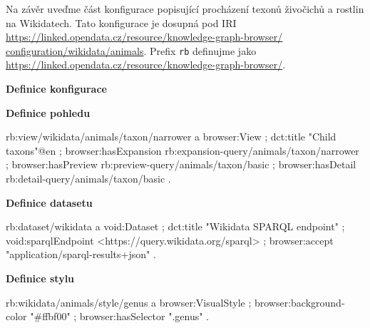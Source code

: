 \begin{prikl}
Na závěr uveďme část konfigurace popisující procházení texonů živočichů a rostlin na Wikidatech. Tato konfigurace je dosupná pod IRI \\\href{https://linked.opendata.cz/resource/knowledge-graph-browser/configuration/wikidata/animals}{https://linked.opendata.cz/resource/knowledge-graph-browser/}\\\href{https://linked.opendata.cz/resource/knowledge-graph-browser/configuration/wikidata/animals}{configuration/wikidata/animals}. Prefix \texttt{rb} definujme jako \\\url{https://linked.opendata.cz/resource/knowledge-graph-browser/}.

\smallskip

\textbf{Definice konfigurace}

\textbf{Definice pohledu}
\begin{code}
rb:view/wikidata/animals/taxon/narrower a browser:View ;
    dct:title "Child taxons"@en ;
    browser:hasExpansion rb:expansion-query/animals/taxon/narrower ;
    browser:hasPreview rb:preview-query/animals/taxon/basic ;
    browser:hasDetail rb:detail-query/animals/taxon/basic .
\end{code}

\textbf{Definice datasetu}
\begin{code}
rb:dataset/wikidata a void:Dataset ;
    dct:title "Wikidata SPARQL endpoint" ;
    void:sparqlEndpoint <https://query.wikidata.org/sparql> ;
    browser:accept "application/sparql-results+json" .
\end{code}

\textbf{Definice stylu}
\begin{code}
rb:wikidata/animals/style/genus a browser:VisualStyle ;
    browser:background-color "#ffbf00" ;
    browser:hasSelector ".genus" .
\end{code}
\end{prikl}


